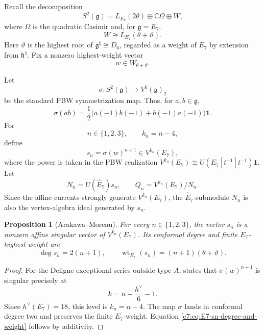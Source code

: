 \documentclass[11pt,reqno]{amsart}
\newtheorem{proposition}[theorem]{Proposition}
\theoremstyle{definition}
\theoremstyle{remark}
\begin{document}
Recall the decomposition
\[
  S^2(\mathfrak g)
  =L_{E_7}(2\theta)\oplus\mathbb C\Omega\oplus W,
\]
where \(\Omega\) is the quadratic Casimir and, for \(\mathfrak g=E_7\),
\begin{equation}
  W\cong L_{E_7}(\theta+\vartheta).
  \label{e7:eq:E7-Joseph-module-W}
\end{equation}
Here \(\vartheta\) is the highest root of
\(\mathfrak g^\natural\cong D_6\), regarded as a weight of \(E_7\) by
extension from \(\mathfrak h^\natural\).  Fix a nonzero highest-weight vector
\[
  w\in W_{\theta+\vartheta}.
\]

Let
\begin{equation*}
  \sigma:S^2(\mathfrak g)\longrightarrow V^k(\mathfrak g)_2
\end{equation*}
be the standard PBW symmetrization map.  Thus, for \(a,b\in\mathfrak g\),
\[
  \sigma(ab)
  =\frac12\bigl(a(-1)b(-1)+b(-1)a(-1)\bigr)\mathbf1.
\]
For
\[
  n\in\{1,2,3\},
  \qquad
  k_n=n-4,
\]
define
\begin{equation*}
  s_n=\sigma(w)^{n+1}\in V^{k_n}(E_7),
\end{equation*}
where the power is taken in the PBW realization
\(V^{k_n}(E_7)\cong U(E_7[t^{-1}]t^{-1})\mathbf1\).  Let
\begin{equation*}
  N_n=U(\widehat{E}_7)s_n,
  \qquad
  Q_n=V^{k_n}(E_7)/N_n.
\end{equation*}
Since the affine currents strongly generate \(V^{k_n}(E_7)\), the
\(\widehat E_7\)-submodule \(N_n\) is also the vertex-algebra ideal generated
by \(s_n\).

\begin{proposition}[Arakawa--Moreau]

For every \(n\in\{1,2,3\}\), the vector \(s_n\) is a nonzero affine singular
vector of \(V^{k_n}(E_7)\).  Its conformal degree and finite
\(E_7\)-highest weight are
\begin{equation}
  \deg s_n=2(n+1),
  \qquad
  \operatorname{wt}_{E_7}(s_n)
  =(n+1)(\theta+\vartheta).
  \label{e7:eq:E7-sn-degree-and-weight}
\end{equation}
\end{proposition}

\begin{proof}
For the Deligne exceptional series outside type \(A\),
\cite[Theorem~4.2(1)(b)]{ArakawaMoreau2018} states that
\(\sigma(w)^{n+1}\) is singular precisely at
\[
  k=n-\frac{h^\vee}{6}-1.
\]
Since \(h^\vee(E_7)=18\), this level is \(k_n=n-4\).  The map \(\sigma\)
lands in conformal degree two and preserves the finite \(E_7\)-weight.
Equation \eqref{e7:eq:E7-sn-degree-and-weight} follows by additivity.
\end{proof}
\end{document}
